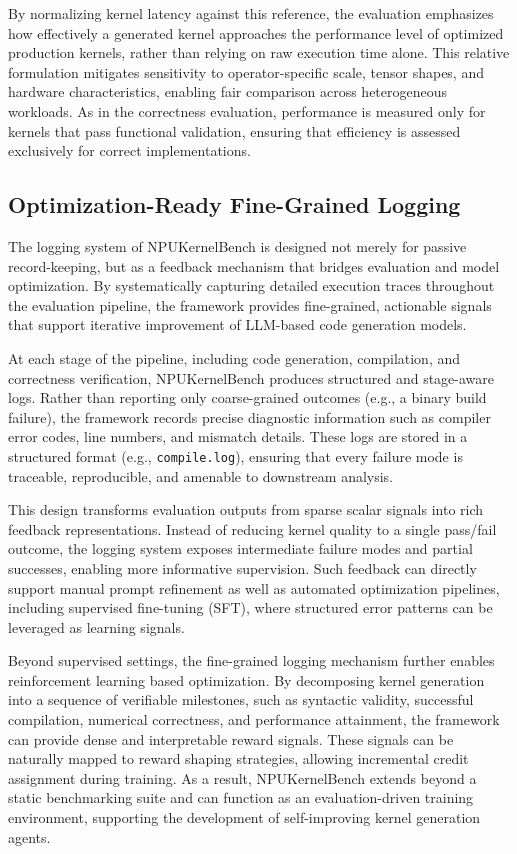By normalizing kernel latency against this reference, the evaluation emphasizes how effectively a generated kernel approaches the performance level of optimized production kernels, rather than relying on raw execution time alone. This relative formulation mitigates sensitivity to operator-specific scale, tensor shapes, and hardware characteristics, enabling fair comparison across heterogeneous workloads. As in the correctness evaluation, performance is measured only for kernels that pass functional validation, ensuring that efficiency is assessed exclusively for correct implementations.

\subsection{Optimization-Ready Fine-Grained Logging}
\label{sec:logging_system}

The logging system of NPUKernelBench is designed not merely for passive record-keeping, but as a feedback mechanism that bridges evaluation and model optimization. By systematically capturing detailed execution traces throughout the evaluation pipeline, the framework provides fine-grained, actionable signals that support iterative improvement of LLM-based code generation models.

At each stage of the pipeline, including code generation, compilation, and correctness verification, NPUKernelBench produces structured and stage-aware logs. Rather than reporting only coarse-grained outcomes (e.g., a binary build failure), the framework records precise diagnostic information such as compiler error codes, line numbers, and mismatch details. These logs are stored in a structured format (e.g., \texttt{compile.log}), ensuring that every failure mode is traceable, reproducible, and amenable to downstream analysis.

This design transforms evaluation outputs from sparse scalar signals into rich feedback representations. Instead of reducing kernel quality to a single pass/fail outcome, the logging system exposes intermediate failure modes and partial successes, enabling more informative supervision. Such feedback can directly support manual prompt refinement as well as automated optimization pipelines, including supervised fine-tuning (SFT), where structured error patterns can be leveraged as learning signals.

Beyond supervised settings, the fine-grained logging mechanism further enables reinforcement learning based optimization. By decomposing kernel generation into a sequence of verifiable milestones, such as syntactic validity, successful compilation, numerical correctness, and performance attainment, the framework can provide dense and interpretable reward signals. These signals can be naturally mapped to reward shaping strategies, allowing incremental credit assignment during training. As a result, NPUKernelBench extends beyond a static benchmarking suite and can function as an evaluation-driven training environment, supporting the development of self-improving kernel generation agents.

